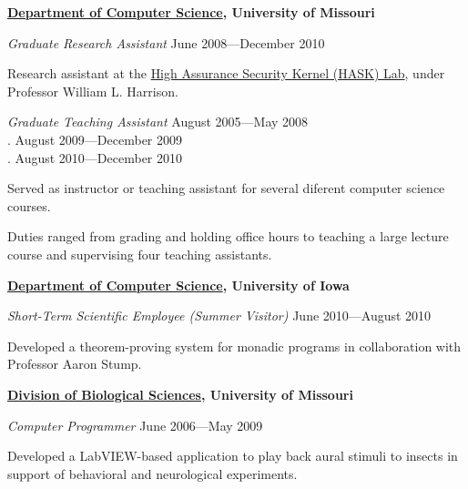 \documentclass[10pt]{article}
\newenvironment{outerlist}[1][\enskip\textbullet]%
        {\begin{itemize}[#1]}{\end{itemize}%
         \vspace{-.6\baselineskip}}
\newenvironment{innerlist}[1][\enskip\textbullet]%
        {\begin{compactitem}[#1]}{\end{compactitem}}
\newcommand{\blankline}{\quad\pagebreak[2]}
\begin{document}
\blankline

\textbf{\href{http://www.cs.missouri.edu/}{Department of Computer Science}, University of Missouri}
\begin{outerlist}
\item[] \textit{Graduate Research Assistant} \hfill June 2008---December 2010
        \begin{innerlist}
        \item Research assistant at the \href{http://hask.cs.missouri.edu/}{High Assurance Security Kernel (HASK) Lab}, under Professor William L. Harrison.
        \end{innerlist}

\item[] \textit{Graduate Teaching Assistant} \hfill August 2005---May 2008\\
        \color{white}.\color{black}          \hfill August 2009---December 2009\\
        \color{white}.\color{black}          \hfill August 2010---December 2010
        \begin{innerlist}
        \item Served as instructor or teaching assistant for several diferent computer science courses.
        \item Duties ranged from grading and holding office hours to teaching a large lecture course and supervising four teaching assistants.
        \end{innerlist}
\end{outerlist}

\blankline

\textbf{\href{http://www.cs.uiowa.edu/}{Department of Computer Science}, University of Iowa}
\begin{outerlist}
\item[] \textit{Short-Term Scientific Employee (Summer Visitor)} \hfill June 2010---August 2010
        \begin{innerlist}
        \item Developed a theorem-proving system for monadic programs in collaboration with Professor Aaron Stump.
        \end{innerlist}
\end{outerlist}

\blankline

\textbf{\href{http://www.biology.missouri.edu/}{Division of Biological Sciences}, University of Missouri}
\begin{outerlist}
\item[] \textit{Computer Programmer} \hfill June 2006---May 2009
        \begin{innerlist}
        \item Developed a LabVIEW-based application to play back aural stimuli to insects in support of behavioral and neurological experiments.
        \end{innerlist}
\end{outerlist}
\end{document}
